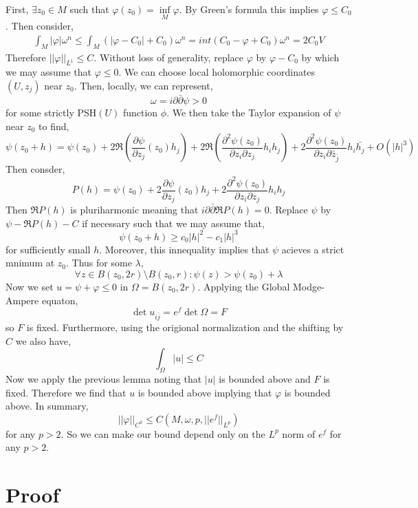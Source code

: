 \documentclass[12pt]{extarticle}
\theoremstyle{definition}
\begin{document}
First, $\exists z_0 \in M$ such that $\varphi(z_0) = \inf\limits_{M} \varphi$. By Green's formula this implies $\varphi \le C_0$. Then consider,
\begin{align*}
\int_M | \varphi | \omega^n \le \int_M \left( |\varphi - C_0| + C_0 \right) \omega^n = int \left( C_0 - \varphi + C_0 \right) \omega^n = 2 C_0 V 
\end{align*}
Therefore $||\varphi||_{L^1} \le C$. 
Without loss of generality, replace $\varphi$ by $\varphi - C_0$ by which we may assume that $\varphi \le 0$. We can choose local holomorphic coordinates $(U, z_j)$ near $z_0$. Then, locally, we can represent,
\[ \omega = i \partial \bar{\partial} \psi > 0 \]
for some strictly PSH$(U)$ function $\phi$. We then take the Taylor expansion of $\psi$ near $z_0$ to find,
\[ \psi(z_0 + h) = \psi(z_0) + 2 \Re{\left( \frac{\partial \psi}{\partial z_j}(z_0) h_j \right)} + 2 \Re{\left( \frac{\partial^2 \psi(z_0)}{\partial z_i \partial z_j} h_i h_j \right)} + 2 \frac{\partial^2 \psi(z_0)}{\partial z_i \partial \bar{z}_{\bar{j}}} h_i \bar{h_j} + O(|h|^3) \] 
Then consder,
\[ P(h) = \psi(z_0) + 2 \frac{\partial \psi}{ \partial z_j}(z_0) h_j + 2 \frac{\partial^2 \psi(z_0)}{\partial z_i \partial z_j} h_i h_j \]
Then $\Re{P(h)}$ is pluriharmonic meaning that $i \partial \bar{\partial} \Re{P(h)} = 0$. Replace $\psi$ by $\psi - \Re{P(h)} - C$ if necessary such that we may assume that,
\[ \psi(z_0 + h) \ge c_0 |h|^2 - c_1 |h|^3 \]
for sufficiently small $h$. Moreover, this innequality implies that $\psi$ acieves a strict mnimum at $z_0$. Thus for some $\lambda$,
\[ \forall z \in B(z_0, 2 r) \setminus B(z_0, r) : \psi(z) > \psi(z_0) + \lambda \]
Now we set $u = \psi + \varphi \le 0$ in $\Omega = B(z_0, 2 r)$. Applying the Global Modge-Ampere equaton,
\[ \det{u_{i \bar{j}}} = e^{f} \det{\Omega} = F \]
so $F$ is fixed. 
Furthermore, using the origional normalization and the shifting by $C$ we also have,
\[ \int_\Omega |u| \le C \]
Now we apply the previous lemma noting that $|u|$ is bounded above and $F$ is fixed. Therefore we find that $u$ is bounded above implying that $\varphi$ is bounded above. In summary,
\[ || \varphi ||_{C^0} \le C(M, \omega, p, || e^f ||_{L^p}) \]
for any $p > 2$. So we can make our bound depend only on the $L^p$ norm of $e^f$ for any $p > 2$. 

\section{Proof}
\end{document}
